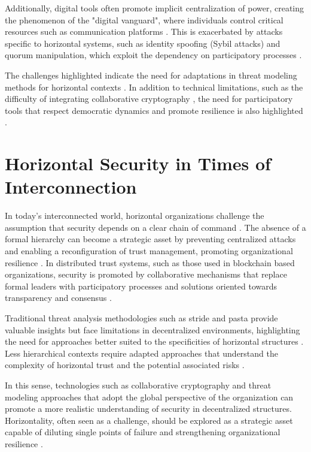Additionally, digital tools often promote implicit centralization of power,
creating the phenomenon of the "digital vanguard", where individuals control
critical resources such as communication platforms \cite{SocialMediaTeamsAsDigitalVanguards}.
This is exacerbated by attacks specific to horizontal systems, such as identity spoofing (Sybil
attacks) and quorum manipulation, which exploit the dependency on participatory
processes \cite{MitigationSybilAttack, TheSybilAttack}.

The challenges highlighted indicate the need for adaptations in threat modeling
methods for horizontal contexts \cite{Colbac}. In addition to technical
limitations, such as the difficulty of integrating collaborative cryptography
\cite{AbcCrypto}, the need for participatory tools that respect democratic
dynamics and promote resilience is also highlighted \cite{SecurityCardsToolkit}.

\section{Horizontal Security in Times of Interconnection}
\label{sec:horizontal_security_interconnection}

In today's interconnected world, horizontal organizations challenge the
assumption that security depends on a clear chain of command
\cite{Non-HierarchicalForms, EverydayRevolutions}.
The absence of a formal hierarchy can become a strategic asset by preventing
centralized attacks and enabling a reconfiguration of trust management,
promoting organizational resilience \cite{EverydayRevolutions, Colbac}. In
distributed trust systems, such as those used in blockchain based organizations,
security is promoted by collaborative mechanisms that replace formal leaders
with participatory processes and solutions oriented towards transparency and
consensus \cite{Reputation-basedDAO, AbcCrypto}.

Traditional threat analysis methodologies such as \gls{stride} and \gls{pasta}
provide valuable insights but face limitations in decentralized environments,
highlighting the need for approaches better suited to the specificities of
horizontal structures \cite{ThreatModellingSurvey,
ThreatModelingASummaryOfAvailableMethods}. Less hierarchical contexts require
adapted approaches that understand the complexity of horizontal trust and the
potential associated risks \cite{Colbac}.

In this sense, technologies such as collaborative cryptography \cite{Colbac,
AbcCrypto} and threat modeling approaches that adopt the global perspective of
the organization can promote a more realistic understanding of security in
decentralized structures. Horizontality, often seen as a challenge, should be
explored as a strategic asset capable of diluting single points of failure and
strengthening organizational resilience \cite{EverydayRevolutions}.

